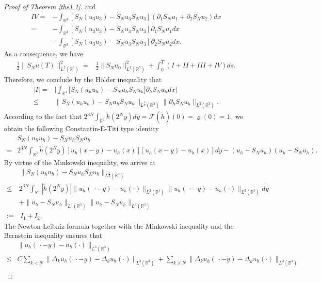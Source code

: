 \documentclass[11pt]{article}
\theoremstyle{plain}\newtheorem{definition}{Definition}[section]
\theoremstyle{definition}\newtheorem{theorem}{Theorem}[section]
\theoremstyle{plain}\newtheorem{lemma}[theorem]{Lemma}
\theoremstyle{plain}\newtheorem{coro}[theorem]{Corollary}
\theoremstyle{plain}\newtheorem{prop}[theorem]{Proposition}
\theoremstyle{remark}\newtheorem{remark}{Remark}[section]
\newcommand{\B}{\Big}
\newcommand{\be}{\begin{equation}}
\newcommand{\ee}{\end{equation}}
\newcommand{\ba}{\begin{aligned}}
\newcommand{\ea}{\end{aligned}}
\newcommand{\f}{\frac}
\numberwithin{equation}{section}
\begin{document}
\begin{proof}[Proof of Theorem \ref{the1.1}]
and
 \be\ba\label{3.4}
IV=&- \int_{\mathbb{R}^{3}} [S_{N}(u_{3}u_{3} )-S_{N} u_{3}S_{N}u_{3}  ] (\partial_{1} S_{N}u_{1}+\partial_{2}S_{N}u_{2})dx \\
=&- \int_{\mathbb{R}^{3}} [S_{N}(u_{3}u_{3} )-S_{N} u_{3}S_{N}u_{3}  ] \partial_{1} S_{N}u_{1} dx \\&-\int_{\mathbb{R}^{3}} [S_{N}(u_{3}u_{3} )-S_{N} u_{3}S_{N}u_{3}  ]  \partial_{2}S_{N}u_{2} dx.
\ea\ee
As a consequence, we have
\be\ba\label{3.5}
 \f12\|S_{N}u(T)\|_{L^{2}(\mathbb{R}^{3})}^{2}  =&\f12\|S_{N}u_{0}\|_{L^{2}(\mathbb{R}^{3})}^{2}+\int_{0}^{T}(I+II+III+IV)ds.
\ea\ee
Therefore, we conclude by the H\"older inequality
  that
\begin{equation}\label{key03}
	\begin{aligned}
	  |I |
=&\B| \int_{\mathbb{R}^{3}}\big[S_{N}(u_{h}u_{h}) -S_{N}u_{h} S_{N}u_{h} \big]\partial_{h} S_{N}u_{h}dx \B|\\
\leq	& \|S_{N}(u_{h}u_{h})  -S_{N}u_{h}S_{N}u_{h}\|_{ L^{\f{3}{2}} (\mathbb{R}^{3})}  \|\partial_{h}S_{N}u_{h}\|_{ L^{3}  (\mathbb{R}^{3})}.
\end{aligned}\end{equation}
According to the fact that $2^{ 3N}\int_{\mathbb{R}^3}\tilde{h}(2^{N}y)dy=\mathcal{F}(\tilde{h})(0)=\varrho(0)=1,$ we obtain the following Constantin-E-Titi type identity
\be\ba\label{ceti}
&S_{N}(u_{h}u_{h}) -S_{N}u_{h} S_{N}u_{h}\\
=&  2^{ 3N}\int_{\mathbb{R}^3}\tilde{h}(2^{N}y)[u_{h}(x-y)-u_{h}(x)]
[u_{h}(x-y)-u_{h}(x)]dy-(u_{h}-S_{N}u_{h})(u_{h}-S_{N}u_{h}).
\ea\ee
By virtue of  the Minkowski inequality, we arrive at
$$\ba\label{key}
 &\|S_{N}(u_{h}u_{h})  -S_{N}u_{h}S_{N}u_{h}\|_{  L^{\f{3}{2}}  (\mathbb{R}^{3})}
 \\\leq& 2^{ 3N}\int_{\mathbb{R}^3}|\tilde{h}(2^{N}y)|\| u_{h}(\,\cdot-y)-u_{h}(\cdot) \|_{ L^{3}  (\mathbb{R}^{3})}
 \| u_{h}(\,\cdot-y)-u_{h}(\cdot) \|_{ L^{3} (\mathbb{R}^{3}) }dy
\\&+\| u_{h}-S_{N}u_{h} \|_{ L^{3}  (\mathbb{R}^{3})} \| u_{h}-S_{N}u_{h}\|_{L^{3} (\mathbb{R}^{3})}\\
:=&\,I_{1}+I_{2}.
\ea$$
The Newton-Leibniz formula together with the Minkowski inequality and the Bernstein inequality ensures that
\begin{align}
&\|u_{h}(\,\cdot-y)-u_{h}(\cdot)\|_{ L^{3} (\mathbb{R}^{3})}\nonumber\\
\leq& C
\sum_{k< N}\|\Delta_{k}u_{h} (\,\cdot-y)-\Delta_{k}u_{h} (\cdot)\|_{L^{3} (\mathbb{R}^{3})} +\sum_{k\geq N}\|\Delta_{k}u_{h} (\,\cdot-y)-\Delta_{k}u_{h}(\cdot)\|_{L^{3} (\mathbb{R}^{3})}\nonumber\\

\end{align}
\end{proof}
\end{document}
